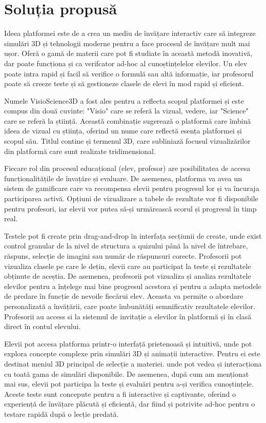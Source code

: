 \section{Soluția propusă}
\label{sec:proj}
Ideea platformei este de a crea un mediu de învățare interactiv care să integreze
simulări 3D și tehnologii moderne pentru a face procesul de învățare mult mai ușor.
Oferă o gamă de materii care pot fi studiate în această metodă inovativă, dar poate 
funcționa și ca verifcator ad-hoc al cunoștințelelor elevilor. Un elev poate intra rapid
și facil să verifice o formulă sau altă informație, iar profesorul poate să creeze teste
și să gestioneze clasele de elevi în mod rapid și eficient.

Numele VisioScience3D a fost ales pentru a reflecta scopul platformei și este compus din două
cuvinte: "Visio" care se referă la vizual, vedere, iar "Science" care se referă la știință.
Această combinație sugerează o platformă care îmbină ideea de vizual cu știința, oferind un nume
care reflectă esența platformei și scopul său. Titlul contine și termenul 3D, care subliniază
focusul vizualizărilor din platformă care sunt realizate tridimensional.

Fiecare rol din procesul educațional (elev, profesor) are posibilitatea de accesa funcționalitățile 
de învațăre și evaluare. De asemenea, platforma va avea un sistem de gamificare care va recompensa
elevii pentru progresul lor și va încuraja participarea activă. Opțiuni de vizualizare a tabele
de rezultate vor fi disponibile pentru profesori, iar elevii vor putea să-și urmărească scorul și 
progresul în timp real.

Testele pot fi create prin drag-and-drop în interfața secțiunii de create, unde exist control granular
de la nivel de structura a quizului până la nivel de întrebare, răspuns, selecție de imagini sau număr de 
răspunsuri corecte. Profesorii pot vizualiza clasele pe care le dețin, elevii care au participat la teste
și rezultatele obținute de aceștia. De asemenea, profesorii pot vizualiza și analiza rezultatele elevilor
pentru a înțelege mai bine progresul acestora și pentru a adapta metodele de predare în funcție de nevoile
fiecărui elev. Aceasta va permite o abordare personalizată a învățării, care poate îmbunătăți semnificativ
rezultatele elevilor. Profesorii au access si la sistemul de invitație a elevilor în platformă și în clasă
direct în contul elevului.

Elevii pot accesa platforma printr-o interfață prietenoasă și intuitivă, unde pot explora concepte
complexe prin simulări 3D și animații interactive. Pentru ei este destinat meniul 3D principal de selecție a 
materiei. unde pot vedea și interacționa cu toată gama de simulări disponibile. De asemenea, după cum am menționat
mai sus, elevii pot participa la teste și evaluări pentru a-și verifica cunoștințele. Aceste teste sunt concepute
pentru a fi interactive și captivante, oferind o experiență de învățare plăcută și eficientă, dar fiind și potrivite 
ad-hoc pentru o testare rapidă după o lecție predată.

